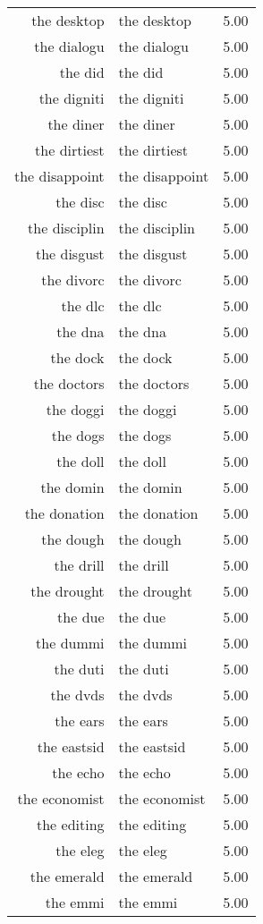 \begin{table}[ht]
\begin{tabular}{rlr}
  the desktop & the desktop & 5.00 \\ 
  the dialogu & the dialogu & 5.00 \\ 
  the did & the did & 5.00 \\ 
  the digniti & the digniti & 5.00 \\ 
  the diner & the diner & 5.00 \\ 
  the dirtiest & the dirtiest & 5.00 \\ 
  the disappoint & the disappoint & 5.00 \\ 
  the disc & the disc & 5.00 \\ 
  the disciplin & the disciplin & 5.00 \\ 
  the disgust & the disgust & 5.00 \\ 
  the divorc & the divorc & 5.00 \\ 
  the dlc & the dlc & 5.00 \\ 
  the dna & the dna & 5.00 \\ 
  the dock & the dock & 5.00 \\ 
  the doctors & the doctors & 5.00 \\ 
  the doggi & the doggi & 5.00 \\ 
  the dogs & the dogs & 5.00 \\ 
  the doll & the doll & 5.00 \\ 
  the domin & the domin & 5.00 \\ 
  the donation & the donation & 5.00 \\ 
  the dough & the dough & 5.00 \\ 
  the drill & the drill & 5.00 \\ 
  the drought & the drought & 5.00 \\ 
  the due & the due & 5.00 \\ 
  the dummi & the dummi & 5.00 \\ 
  the duti & the duti & 5.00 \\ 
  the dvds & the dvds & 5.00 \\ 
  the ears & the ears & 5.00 \\ 
  the eastsid & the eastsid & 5.00 \\ 
  the echo & the echo & 5.00 \\ 
  the economist & the economist & 5.00 \\ 
  the editing & the editing & 5.00 \\ 
  the eleg & the eleg & 5.00 \\ 
  the emerald & the emerald & 5.00 \\ 
  the emmi & the emmi & 5.00 \\ 

\end{tabular}
\end{table}
